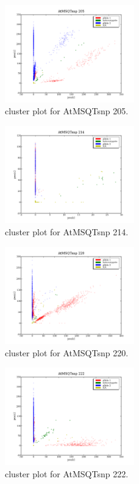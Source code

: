 \begin{figure}[H]
\includegraphics[width=0.5\textwidth]{figures/cluster_plot_AtMSQTsnp_205.png}
\caption{cluster plot for AtMSQTsnp 205.} \label{flAtMSQTsnp205}
\end{figure}
\begin{figure}[H]
\includegraphics[width=0.5\textwidth]{figures/cluster_plot_AtMSQTsnp_214.png}
\caption{cluster plot for AtMSQTsnp 214.} \label{flAtMSQTsnp214}
\end{figure}
\begin{figure}[H]
\includegraphics[width=0.5\textwidth]{figures/cluster_plot_AtMSQTsnp_220.png}
\caption{cluster plot for AtMSQTsnp 220.} \label{flAtMSQTsnp220}
\end{figure}
\begin{figure}[H]
\includegraphics[width=0.5\textwidth]{figures/cluster_plot_AtMSQTsnp_222.png}
\caption{cluster plot for AtMSQTsnp 222.} \label{flAtMSQTsnp222}
\end{figure}
